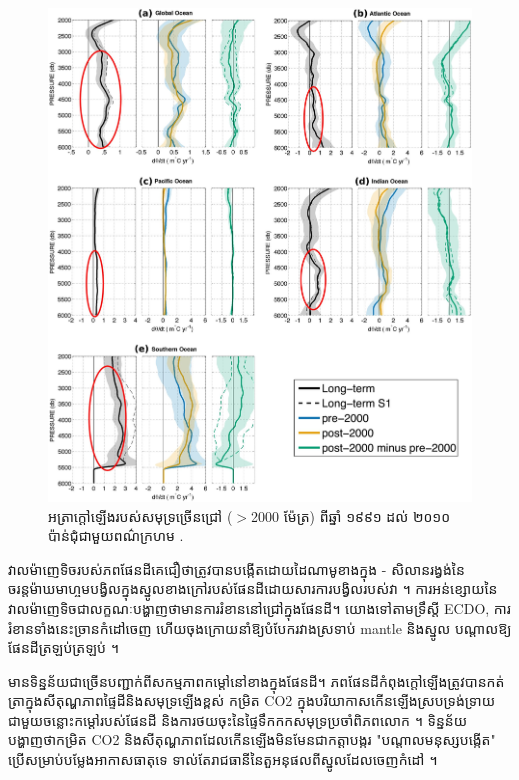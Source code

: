 \documentclass[10pt,twocolumn,letterpaper]{article}
\begin{document}
\begin{figure}[t]
\begin{center}
   \includegraphics[width=1\linewidth]{ocean-highlight.jpg}
\end{center}
   \caption{អត្រាក្ដៅឡើងរបស់សមុទ្រច្រើនជ្រៅ ($>$2000 ម៉ែត្រ) ពីឆ្នាំ ១៩៩១ ដល់ ២០១០ ប៉ាន់ជុំជាមួយពណ៌ក្រហម \cite{132}.}
\label{fig:15}
\label{fig:onecol}
\end{figure}

វាលម៉ាញេទិចរបស់ភពផែនដីគេជឿថាត្រូវបានបង្កើតដោយដៃណាមូខាងក្នុង - សិលានរង្វង់នៃចរន្តម៉ាឃមាហ្ចមបង្វិលក្នុងស្នូលខាងក្រៅរបស់ផែនដីដោយសារការ​បង្វិលរបស់វា \cite{123}។ ការអន់ខ្សោយនៃវាលម៉ាញេទិចជាលក្ខណៈបង្ហាញថាមានការរំខាននៅជ្រៅក្នុងផែនដី។ យោងទៅតាមទ្រឹស្តី ECDO, ការរំខានទាំងនេះច្រានកំដៅចេញ ហើយចុងក្រោយនាំឱ្យបំបែករវាងស្រទាប់ mantle និងស្នូល បណ្ដាលឱ្យផែនដីត្រឡប់ត្រឡប់ \cite{1}។

មានទិន្នន័យជាច្រើនបញ្ជាក់ពីសកម្មភាពកម្ដៅនៅខាងក្នុងផែនដី។ ភពផែនដីកំពុងក្តៅឡើងត្រូវបានកត់ត្រាក្នុងសីតុណ្ហភាពផ្ទៃដីនិងសមុទ្រឡើងខ្ពស់ \cite{127,128} កម្រិត CO2 ក្នុងបរិយាកាសកើនឡើងស្របទ្រង់ទ្រាយជាមួយចន្លោះកម្ដៅរបស់ផែនដី \cite{129,130} និងការថយចុះនៃផ្ទៃទឹកកកសមុទ្រប្រចាំពិភពលោក \cite{131}។ ទិន្នន័យបង្ហាញថាកម្រិត CO2 និងសីតុណ្ហភាពដែលកើនឡើងមិនមែនជាកត្តាបង្ករ "បណ្ដាលមនុស្សបង្កើត" ប្រើសម្រាប់បម្លែងអាកាសធាតុទេ ទាល់តែរាជធានីនៃតួអនុផលពីស្នូលដែលចេញកំដៅ \cite{129}។
\end{document}
